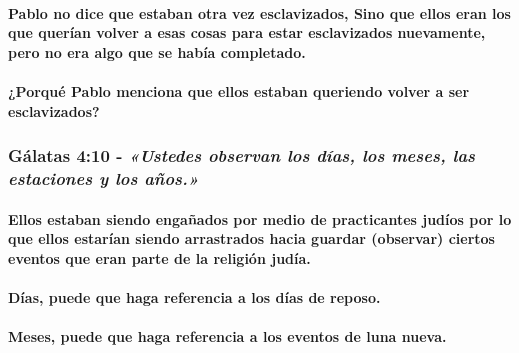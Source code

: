 \documentclass[11a pt,twoside]{article}
\newcommand{\scripture}[1]{%
  {\fontsize{12pt}{16pt}\selectfont\ScriptureFont\itshape #1}%
}
\let\oldsubsubsection\subsubsection
\renewcommand{\subsubsection}{\needspace{4\baselineskip}\oldsubsubsection}
\let\oldparagraph\paragraph
\renewcommand{\paragraph}{\needspace{3\baselineskip}\oldparagraph}
\begin{document}
\paragraph{Pablo no dice que estaban otra vez esclavizados, Sino que
ellos eran los que querían volver a esas cosas para estar esclavizados
nuevamente, pero no era algo que se había
completado.}\label{pablo-no-dice-que-estaban-otra-vez-esclavizados-sino-que-ellos-eran-los-que-queruxedan-volver-a-esas-cosas-para-estar-esclavizados-nuevamente-pero-no-era-algo-que-se-habuxeda-completado.}

\paragraph{¿Porqué Pablo menciona que ellos estaban queriendo volver a
ser
esclavizados?}\label{porquuxe9-pablo-menciona-que-ellos-estaban-queriendo-volver-a-ser-esclavizados}

\subsubsection{\texorpdfstring{Gálatas 4:10 -
\scripture{«Ustedes observan los días, los meses, las estaciones y los años.»}}{Gálatas 4:10 - }}\label{guxe1latas-410---ustedes-observan-los-duxedas-los-meses-las-estaciones-y-los-auxf1os.}

\paragraph{Ellos estaban siendo engañados por medio de practicantes
judíos por lo que ellos estarían siendo arrastrados hacia guardar
(observar) ciertos eventos que eran parte de la religión
judía.}\label{ellos-estaban-siendo-engauxf1ados-por-medio-de-practicantes-juduxedos-por-lo-que-ellos-estaruxedan-siendo-arrastrados-hacia-guardar-observar-ciertos-eventos-que-eran-parte-de-la-religiuxf3n-juduxeda.}

\paragraph{Días, puede que haga referencia a los días de
reposo.}\label{duxedas-puede-que-haga-referencia-a-los-duxedas-de-reposo.}

\paragraph{Meses, puede que haga referencia a los eventos de luna
nueva.}\label{meses-puede-que-haga-referencia-a-los-eventos-de-luna-nueva.}
\end{document}
